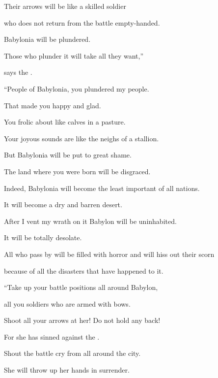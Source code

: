 {\par }{\Q Their arrows
will be like a skilled soldier
\par }{\Q who
does not
return
from the battle empty-handed.
\par }{\Q {}Babylonia
will be
plundered.
\par }{\Q Those who plunder
it will take all
they want,”
\par }{\Q says
the {}.
\par }{\Q {}“People of Babylonia, you plundered
my people.
\par }{\Q That
made you happy
and glad.
\par }{\Q You frolic
about like calves
in a pasture.
\par }{\Q Your joyous sounds are like the neighs
of a stallion.
\par }{\Q {}But Babylonia
will be put to great
shame.
\par }{\Q The land where you were born
will be disgraced.
\par }{\Q Indeed,
Babylonia will become the least important of all nations.
\par }{\Q It will become a dry
and barren
desert.
\par }{\Q {}After I vent my wrath
on it Babylon
will be uninhabited.
\par }{\Q It will be
totally
desolate.
\par }{\Q All
who pass by
will be filled with horror
and will hiss
out their scorn
\par }{\Q because
of all
the disasters that have happened to it.
\par }{\Q {}“Take up your battle positions
all around
Babylon,
\par }{\Q all
you soldiers
who are armed with bows.
\par }{\Q Shoot
all your arrows
at her! Do not
hold
any back!

\par }{\Q For
she has sinned
against the
{}.
\par }{\Q {}Shout
the battle cry from all around
the city.
\par }{\Q She will
throw up her hands
in surrender.

}
